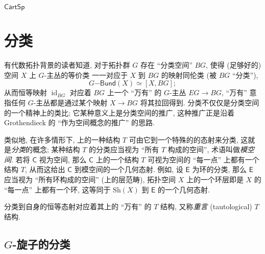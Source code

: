 \begin{example}
	[label={Lawvere-theory-CartSp}]
	{}
	$\mathsf {CartSp}$
\end{example}

\section{分类\topos{}}


有代数拓扑背景的读者知道, 对于拓扑群 $G$ 存在 ``分类空间'' $BG$,
使得 (足够好的) 空间 $X$ 上 $G$-主丛的等价类
一一对应于 $X$ 到 $BG$ 的映射同伦类 (被 $BG$ ``分类''),
$$
G\mathsf{-Bund} (X) \simeq [X,BG];
$$
从而恒等映射 $\operatorname{id}_{BG}$ 对应着 $BG$ 上一个 ``万有'' 的 $G$-主丛 $EG \to BG$,
``万有'' 意指任何 $G$-主丛都是通过某个映射 $X \to BG$ 将其拉回得到.
分类\topos{}不仅仅是分类空间的一个精神上的类比; 它某种意义上是分类空间的推广, 这种推广正是沿着 Grothendieck 的 ``\topos{}作为空间概念的推广'' 的思路.

类似地, 在许多情形下, \topos{}上的一种结构 $T$ 可由它到一个特殊的\topos{}的态射来分类, 这就是\emph{分类\topos{}}的概念;
某种结构 $T$ 的分类\topos{}应当视为 ``所有 $T$ 构成的空间'', 术语叫做\emph{模空间}.
若将\topos{} $\mathsf C$ 视为空间, 那么 $\mathsf C$ 上的一个结构 $T$ 可视为空间的 ``每一点'' 上都有一个结构 $T$,
从而这给出 $\mathsf C$ 到模空间的一个几何态射.
例如, 设 $\mathsf E$ 为环的分类\topos{}, 那么 $\mathsf E$ 应当视为 ``所有环构成的空间'' (上的层范畴), 拓扑空间 $X$ 上的一个环层即是 $X$ 的 ``每一点'' 上都有一个环,
这等同于 $\text{Sh}(X)$ 到 $\mathsf E$ 的一个几何态射.

分类\topos{}到自身的恒等态射对应着其上的 ``万有'' 的 $T$ 结构, 又称\emph{重言} (tautological) $T$ 结构.

\subsection{$G$-旋子的分类\topos{}}


